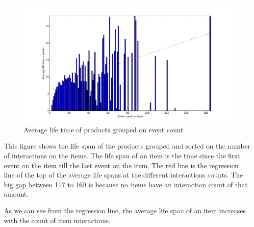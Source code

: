     \begin{figure}[H]
        \includegraphics[width=5in]{image/avglifetimeoncount.png}
        \centering
        \caption{Average life time of products grouped on event count}
    \label{figure:averageLifetimBasedoncount}
    \end{figure}
        This figure shows the life span of the products grouped and sorted on the number of interactions on the items.
        The life span of an item is the time since the first event on the item till the last event on the item.
        The red line is the regression line of the top of the average life spans at the different interactions counts.
        The big gap between 117 to 160 is because no items have an interaction count of that amount.

        As we can see from the regression line, the average life span of an item increases with the count of item interactions.

